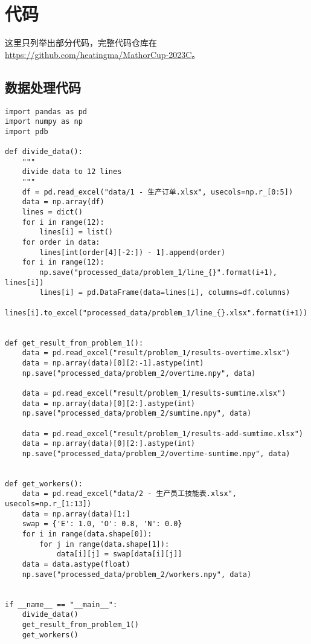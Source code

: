 \newpage
\section{代码}
这里只列举出部分代码，完整代码仓库在 \href{https://github.com/heatingma/MathorCup-2023C}{https://github.com/heatingma/MathorCup-2023C}。

\subsection{数据处理代码}

\begin{lstlisting}[caption={数据处理}, label={lst:python}]
import pandas as pd
import numpy as np
import pdb

def divide_data():
    """
    divide data to 12 lines
    """
    df = pd.read_excel("data/1 - 生产订单.xlsx", usecols=np.r_[0:5])
    data = np.array(df)
    lines = dict()
    for i in range(12):
        lines[i] = list()        
    for order in data:
        lines[int(order[4][-2:]) - 1].append(order)
    for i in range(12):
        np.save("processed_data/problem_1/line_{}".format(i+1), lines[i])
        lines[i] = pd.DataFrame(data=lines[i], columns=df.columns)
        lines[i].to_excel("processed_data/problem_1/line_{}.xlsx".format(i+1))


def get_result_from_problem_1():
    data = pd.read_excel("result/problem_1/results-overtime.xlsx")
    data = np.array(data)[0][2:-1].astype(int)
    np.save("processed_data/problem_2/overtime.npy", data)

    data = pd.read_excel("result/problem_1/results-sumtime.xlsx")
    data = np.array(data)[0][2:].astype(int)
    np.save("processed_data/problem_2/sumtime.npy", data)    
    
    data = pd.read_excel("result/problem_1/results-add-sumtime.xlsx")
    data = np.array(data)[0][2:].astype(int)
    np.save("processed_data/problem_2/overtime-sumtime.npy", data)
    

def get_workers():
    data = pd.read_excel("data/2 - 生产员工技能表.xlsx", usecols=np.r_[1:13])
    data = np.array(data)[1:]
    swap = {'E': 1.0, 'O': 0.8, 'N': 0.0}
    for i in range(data.shape[0]):
        for j in range(data.shape[1]):
            data[i][j] = swap[data[i][j]]
    data = data.astype(float)
    np.save("processed_data/problem_2/workers.npy", data)


if __name__ == "__main__":
    divide_data()
    get_result_from_problem_1()
    get_workers()

\end{lstlisting}

